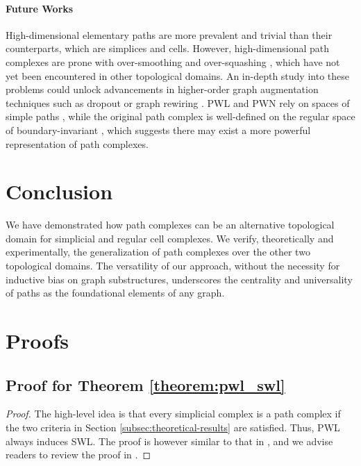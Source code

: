 \documentclass[letterpaper]{article} \usepackage{aaai24}  \usepackage{times}  \usepackage{helvet}  \usepackage{courier}  \usepackage[hyphens]{url}  \usepackage{graphicx} \urlstyle{rm} \def\UrlFont{\rm}  \usepackage{natbib}  \usepackage{caption} \frenchspacing  \setlength{\pdfpagewidth}{8.5in} \setlength{\pdfpageheight}{11in} \usepackage{algorithm}
\begin{document}
\paragraph{Future Works}  High-dimensional elementary paths are more prevalent and trivial than their counterparts, which are simplices and cells. However, high-dimensional path complexes are prone with over-smoothing \cite{oono_graph_2021, li_deeper_2018} and over-squashing \cite{alon_bottleneck_2021}, which have not yet been encountered in other topological domains. An in-depth study into these problems could unlock advancements in higher-order graph augmentation techniques such as dropout \cite{rong_dropedge_2020, papp_dropgnn_2021} or graph rewiring \cite{topping_understanding_2022}. PWL and PWN rely on spaces of simple paths , while the original path complex is well-defined on the regular space of boundary-invariant , which suggests there may exist a more powerful representation of path complexes.

\section{Conclusion}

We have demonstrated how path complexes can be an alternative topological domain for simplicial and regular cell complexes. We verify, theoretically and experimentally, the generalization of path complexes over the other two topological domains. The versatility of our approach, without the necessity for inductive bias on graph substructures, underscores the centrality and universality of paths as the foundational elements of any graph.



\clearpage
\appendix
\section{Proofs}

\subsection{Proof for Theorem \ref{theorem:pwl_swl}}

\begin{proof}
    The high-level idea is that every simplicial complex is a path complex if the two criteria in Section \ref{subsec:theoretical-results} are satisfied. Thus, PWL always induces SWL. The proof is however similar to that in \cite{bodnar_weisfeiler_2022}, and we advise readers to review the proof in \cite{bodnar_weisfeiler_2022}. 
\end{proof}
\end{document}
